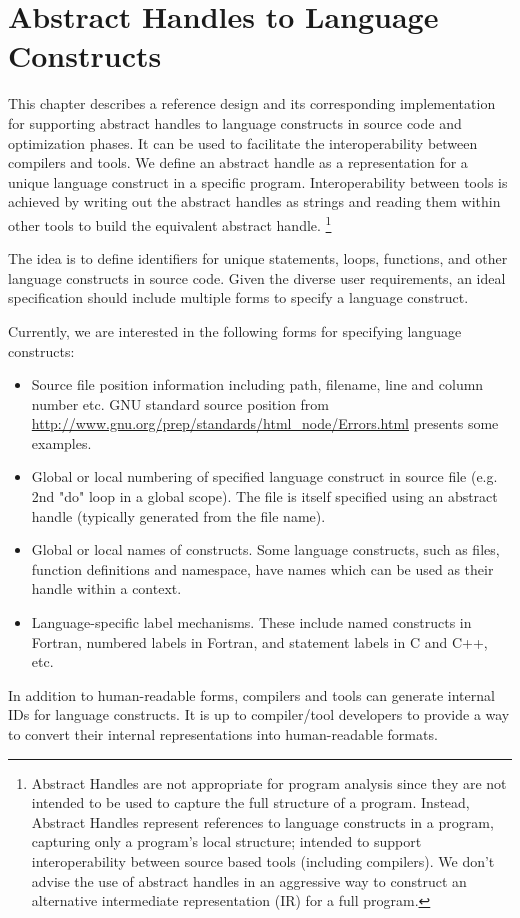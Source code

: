 \chapter{Abstract Handles to Language Constructs}
\label{chap:handles}
This chapter describes a reference design and its corresponding implementation for
supporting abstract handles to language constructs in source code and optimization
phases. It can be used to facilitate the interoperability between compilers and tools.
We define an abstract handle as a representation for a unique language construct in a
specific program.  Interoperability between tools is achieved by writing out the abstract handles as
strings and reading them within other tools to build the equivalent abstract handle.
\footnote{Abstract Handles are not appropriate for program analysis
since they are not intended to be used to capture the full structure of a program. Instead, 
Abstract Handles represent references to language constructs in a program, capturing only
a program's local structure; intended to support interoperability between source based
tools (including compilers).  We don't advise the use of abstract handles in an
aggressive way to construct an alternative intermediate representation (IR) for a full
program.}

The idea is to define identifiers for unique statements, loops, functions, 
and other language constructs in source code. Given the diverse user requirements, an
ideal specification should include multiple forms to specify a language construct.

Currently, we are interested in the following forms for specifying language constructs:
\begin{itemize}
   \item Source file position information including path, filename, line and column number etc. 
      GNU standard source position from 
      \url{http://www.gnu.org/prep/standards/html\_node/Errors.html} presents
      some examples.  
   \item Global or local numbering of specified language construct in source file
      (e.g. 2nd "do" loop in a global scope).  The file is itself specified using an
       abstract handle (typically generated from the file name). 
   \item Global or local names of constructs. Some language constructs, such
      as files, function definitions and namespace, have names which can be
      used as their handle within a context.
   \item Language-specific label mechanisms. These include named constructs in Fortran,
      numbered labels in Fortran, and statement labels in C and C++, etc. 
\end{itemize}
In addition to human-readable forms, compilers and tools can generate
internal IDs for language constructs. It is up to compiler/tool developers
to provide a way to convert their internal representations into human-readable formats. 

